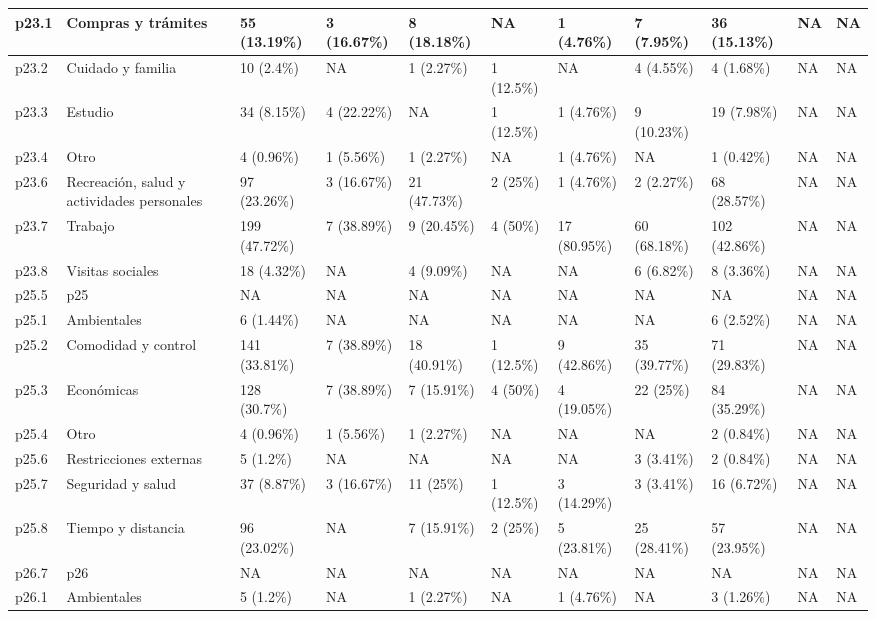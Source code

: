 \begin{table}
{\begin{tabular}[t]{l|l|l|l|l|l|l|l|l|l|l}
\hline
p23.1 & Compras y trámites & 55 (13.19\%) & 3 (16.67\%) & 8 (18.18\%) & NA & 1 (4.76\%) & 7 (7.95\%) & 36 (15.13\%) & NA & NA\\
\hline
p23.2 & Cuidado y familia & 10 (2.4\%) & NA & 1 (2.27\%) & 1 (12.5\%) & NA & 4 (4.55\%) & 4 (1.68\%) & NA & NA\\
\hline
p23.3 & Estudio & 34 (8.15\%) & 4 (22.22\%) & NA & 1 (12.5\%) & 1 (4.76\%) & 9 (10.23\%) & 19 (7.98\%) & NA & NA\\
\hline
p23.4 & Otro & 4 (0.96\%) & 1 (5.56\%) & 1 (2.27\%) & NA & 1 (4.76\%) & NA & 1 (0.42\%) & NA & NA\\
\hline
p23.6 & Recreación, salud y actividades personales & 97 (23.26\%) & 3 (16.67\%) & 21 (47.73\%) & 2 (25\%) & 1 (4.76\%) & 2 (2.27\%) & 68 (28.57\%) & NA & NA\\
\hline
p23.7 & Trabajo & 199 (47.72\%) & 7 (38.89\%) & 9 (20.45\%) & 4 (50\%) & 17 (80.95\%) & 60 (68.18\%) & 102 (42.86\%) & NA & NA\\
\hline
p23.8 & Visitas sociales & 18 (4.32\%) & NA & 4 (9.09\%) & NA & NA & 6 (6.82\%) & 8 (3.36\%) & NA & NA\\
\hline
p25.5 & p25 & NA & NA & NA & NA & NA & NA & NA & NA & NA\\
\hline
p25.1 & Ambientales & 6 (1.44\%) & NA & NA & NA & NA & NA & 6 (2.52\%) & NA & NA\\
\hline
p25.2 & Comodidad y control & 141 (33.81\%) & 7 (38.89\%) & 18 (40.91\%) & 1 (12.5\%) & 9 (42.86\%) & 35 (39.77\%) & 71 (29.83\%) & NA & NA\\
\hline
p25.3 & Económicas & 128 (30.7\%) & 7 (38.89\%) & 7 (15.91\%) & 4 (50\%) & 4 (19.05\%) & 22 (25\%) & 84 (35.29\%) & NA & NA\\
\hline
p25.4 & Otro & 4 (0.96\%) & 1 (5.56\%) & 1 (2.27\%) & NA & NA & NA & 2 (0.84\%) & NA & NA\\
\hline
p25.6 & Restricciones externas & 5 (1.2\%) & NA & NA & NA & NA & 3 (3.41\%) & 2 (0.84\%) & NA & NA\\
\hline
p25.7 & Seguridad y salud & 37 (8.87\%) & 3 (16.67\%) & 11 (25\%) & 1 (12.5\%) & 3 (14.29\%) & 3 (3.41\%) & 16 (6.72\%) & NA & NA\\
\hline
p25.8 & Tiempo y distancia & 96 (23.02\%) & NA & 7 (15.91\%) & 2 (25\%) & 5 (23.81\%) & 25 (28.41\%) & 57 (23.95\%) & NA & NA\\
\hline
p26.7 & p26 & NA & NA & NA & NA & NA & NA & NA & NA & NA\\
\hline
p26.1 & Ambientales & 5 (1.2\%) & NA & 1 (2.27\%) & NA & 1 (4.76\%) & NA & 3 (1.26\%) & NA & NA\\

\end{tabular}}
\end{table}
